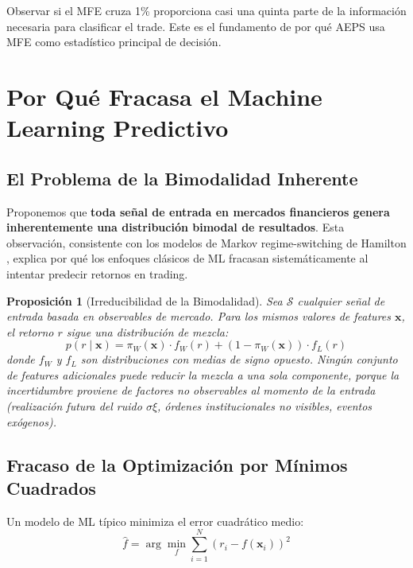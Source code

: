 \documentclass[11pt,a4paper]{article}
\newtheorem{proposition}{Proposici\'on}[section]
\begin{document}
Observar si el MFE cruza 1\% proporciona casi una quinta parte de
la informaci\'on necesaria para clasificar el trade. Este es el
fundamento de por qu\'e AEPS usa MFE como estad\'istico principal
de decisi\'on.


\section{Por Qu\'e Fracasa el Machine Learning Predictivo}
\label{sec:ml_failure}

\subsection{El Problema de la Bimodalidad Inherente}

Proponemos que \textbf{toda se\~nal de entrada en mercados financieros
genera inherentemente una distribuci\'on bimodal de resultados}. Esta
observaci\'on, consistente con los modelos de Markov regime-switching
de Hamilton \cite{hamilton1989regime}, explica por qu\'e los enfoques
cl\'asicos de ML fracasan sistem\'aticamente al intentar predecir
retornos en trading.

\begin{proposition}[Irreducibilidad de la Bimodalidad]
\label{prop:bimodal_irreducible}
Sea $\mathcal{S}$ cualquier se\~nal de entrada basada en observables
de mercado. Para los mismos valores de features $\bm{x}$, el retorno
$r$ sigue una distribuci\'on de mezcla:
\begin{equation}
p(r \mid \bm{x}) = \pi_W(\bm{x}) \cdot f_W(r) + (1 - \pi_W(\bm{x})) \cdot f_L(r)
\label{eq:bimodal_inherent}
\end{equation}
donde $f_W$ y $f_L$ son distribuciones con medias de signo opuesto.
Ning\'un conjunto de features adicionales puede reducir la mezcla
a una sola componente, porque la incertidumbre proviene de factores
no observables al momento de la entrada (realizaci\'on futura del
ruido $\sigma\xi$, \'ordenes institucionales no visibles, eventos
ex\'ogenos).
\end{proposition}

\subsection{Fracaso de la Optimizaci\'on por M\'inimos Cuadrados}

Un modelo de ML t\'ipico minimiza el error cuadr\'atico medio:
\begin{equation}
\hat{f} = \arg\min_f \sum_{i=1}^{N} \left(r_i - f(\bm{x}_i)\right)^2
\label{eq:mse}
\end{equation}
\end{document}
